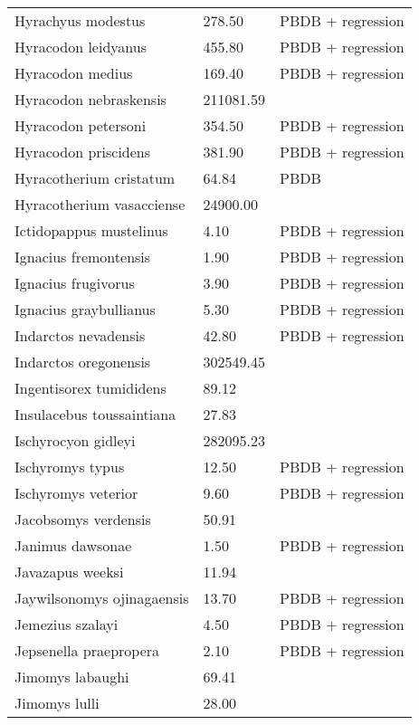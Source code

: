 \begin{longtable}{p{} p{} p{}}
    Hyrachyus modestus & 278.50 & PBDB + regression \\ 
    Hyracodon leidyanus & 455.80 & PBDB + regression \\ 
    Hyracodon medius & 169.40 & PBDB + regression \\ 
    Hyracodon nebraskensis & 211081.59 & \cite{Tomiya2013} \\ 
    Hyracodon petersoni & 354.50 & PBDB + regression \\ 
    Hyracodon priscidens & 381.90 & PBDB + regression \\ 
    Hyracotherium cristatum & 64.84 & PBDB \\ 
    Hyracotherium vasacciense & 24900.00 & \cite{MacFadden1986} \\ 
    Ictidopappus mustelinus & 4.10 & PBDB + regression \\ 
    Ignacius fremontensis & 1.90 & PBDB + regression \\ 
    Ignacius frugivorus & 3.90 & PBDB + regression \\ 
    Ignacius graybullianus & 5.30 & PBDB + regression \\ 
    Indarctos nevadensis & 42.80 & PBDB + regression \\ 
    Indarctos oregonensis & 302549.45 & \cite{Tomiya2013} \\ 
    Ingentisorex tumididens & 89.12 & \cite{Tomiya2013} \\ 
    Insulacebus toussaintiana & 27.83 & \cite{Loomis1932} \\ 
    Ischyrocyon gidleyi & 282095.23 & \cite{Tomiya2013} \\ 
    Ischyromys typus & 12.50 & PBDB + regression \\ 
    Ischyromys veterior & 9.60 & PBDB + regression \\ 
    Jacobsomys verdensis & 50.91 & \cite{Tomiya2013} \\ 
    Janimus dawsonae & 1.50 & PBDB + regression \\ 
    Javazapus weeksi & 11.94 & \cite{Tomiya2013} \\ 
    Jaywilsonomys ojinagaensis & 13.70 & PBDB + regression \\ 
    Jemezius szalayi & 4.50 & PBDB + regression \\ 
    Jepsenella praepropera & 2.10 & PBDB + regression \\ 
    Jimomys labaughi & 69.41 & \cite{Tomiya2013} \\ 
    Jimomys lulli & 28.00 & \cite{McKenna2011} \\ 

\end{longtable}
